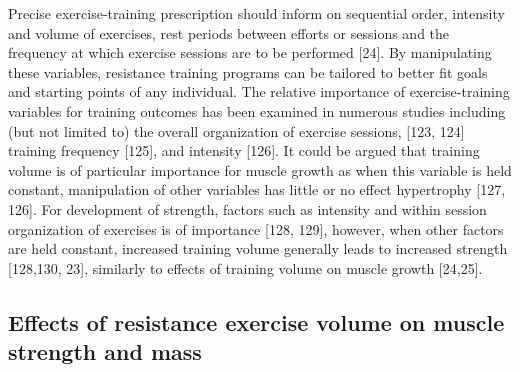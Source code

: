 \documentclass[twoside,10pt]{gihclass} %
\begin{document}
Precise exercise-training prescription should inform on sequential order, intensity and volume of exercises, rest periods between efforts or sessions and the frequency at which exercise sessions are to be performed
{[}24{]}.
By manipulating these variables, resistance training programs can be tailored to better fit goals and starting points of any individual.
The relative importance of exercise-training variables for training outcomes has been examined in numerous studies including (but not limited to) the overall organization of exercise sessions,
{[}123, 124{]}
training frequency
{[}125{]},
and intensity
{[}126{]}.
It could be argued that training volume is of particular importance for muscle growth as when this variable is held constant, manipulation of other variables has little or no effect hypertrophy
{[}127, 126{]}.
For development of strength, factors such as intensity and within session organization of exercises is of importance
{[}128, 129{]},
however, when other factors are held constant, increased training volume generally leads to increased strength
{[}128,130, 23{]},
similarly to effects of training volume on muscle growth
{[}24,25{]}.

\hypertarget{effects-of-resistance-exercise-volume-on-muscle-strength-and-mass}{%
\subsection{Effects of resistance exercise volume on muscle strength and mass}\label{effects-of-resistance-exercise-volume-on-muscle-strength-and-mass}}
\end{document}
